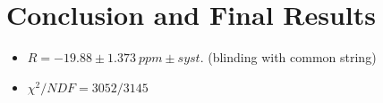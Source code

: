 \chapter{Conclusion and Final Results}
\label{Ch:Conclusion}

\begin{itemize}
	\item{$R = -19.88 \pm \SI{1.373}{ppm} \pm syst.$ (blinding with common string)}
	\item{$\chi^{2}/NDF = 3052/3145$}
\end{itemize}
